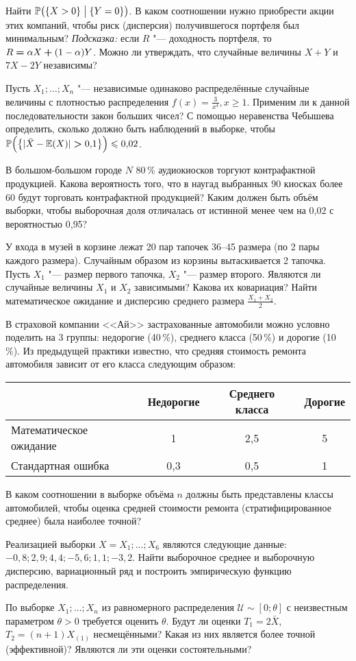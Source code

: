 \documentclass[pdftex,12pt,a4paper]{article}
\newenvironment{enumerate*}{
\begin{enumerate}
  \setlength{\itemsep}{0pt}
  \setlength{\parskip}{0pt}
  \setlength{\parsep}{0pt}
}{\end{enumerate}}
\begin{document}
\begin{enumerate*}
    Найти $\mathbb{P}\bigl( \{X>0\} \bigm| \{Y=0\}\bigr)$. В каком соотношении нужно приобрести акции этих компаний, чтобы риск (дисперсия) получившегося портфеля был минимальным? \emph{Подсказка:} если $R$ "--- доходность портфеля, то $R\hm=\alpha X\hm+(1-\alpha)Y$. Можно ли утверждать, что случайные величины $X+Y$ и $7X-2Y$ независимы?
\item Пусть $X_1;\ldots;X_n$ "--- независимые одинаково распределённые случайные величины с плотностью распределения $f(x)=\frac{3}{x^4}, x\geqslant 1$. Применим ли к данной последовательности закон больших чисел? С помощью неравенства Чебышева определить, сколько должно быть наблюдений в выборке, чтобы $\mathbb{P}\Bigl( \big\{ |\bar X -\mathbb{E}(X)|\hm>0{,}1\big\} \Big)\leqslant 0{,}02$.
\item В большом-большом городе $N$ 80\,\% аудиокиосков торгуют контрафактной продукцией. Какова вероятность того, что  в наугад выбранных 90 киосках более 60 будут торговать контрафактной  продукцией? Каким должен быть объём выборки, чтобы выборочная доля отличалась от истинной менее чем на 0{,}02 с вероятностью 0{,}95?
\item У входа в музей в корзине лежат 20 пар тапочек 36--45 размера (по 2 пары каждого размера). Случайным образом из корзины вытаскивается 2 тапочка. Пусть $X_1$ "--- размер первого тапочка, $X_2$ "--- размер второго. Являются ли случайные величины $X_1$ и $X_2$ зависимыми? Какова их ковариация? Найти математическое ожидание и дисперсию среднего размера $\frac{X_1+X_2}{2}$.
\item В страховой компании <<Ай>> застрахованные автомобили можно условно поделить на 3 группы: недорогие (40\,\%), среднего класса (50\,\%) и дорогие (10\,\%). Из предыдущей практики известно, что средняя стоимость ремонта автомобиля зависит от его класса следующим образом:
    \begin{center}
    \begin{tabular}{|l|c|c|c|}
    \hline
    & Недорогие & Среднего класса & Дорогие \\ \hline
    Математическое ожидание & 1 & 2{,}5 & 5 \\ \hline
    Стандартная ошибка & 0{,}3 & 0{,}5 & 1 \\ \hline
    \end{tabular}
    \end{center}
    В каком соотношении в выборке объёма $n$ должны быть представлены классы автомобилей, чтобы оценка средней стоимости ремонта (стратифицированное среднее) была наиболее точной?
\item Реализацией выборки $X=X_1;\ldots;X_6$ являются следующие данные: $-0{,}8;2{,}9;4{,}4;-5{,}6;1{,}1;-3{,}2$. Найти выборочное среднее и выборочную дисперсию, вариационный ряд и построить эмпирическую функцию распределения.
\item По выборке $X_1;\ldots;X_n$ из равномерного распределения $\mathcal{U}\sim[0;\theta]$ с неизвестным параметром $\theta >0$ требуется оценить $\theta$. Будут ли оценки $T_1=2\bar{X}$, $T_2=(n+1)X_{(1)}$ несмещёнными? Какая из них является более точной (эффективной)? Являются ли эти оценки состоятельными?
\end{enumerate*}
\end{document}
